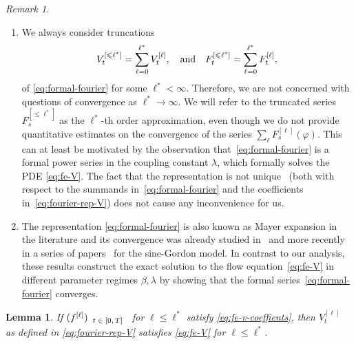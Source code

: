 \documentclass[11pt, a4paper]{scrartcl}
\numberwithin{equation}{section}
\theoremstyle{plain}
\newtheorem{lemma}[foo]{Lemma}
\theoremstyle{remark}
\newtheorem{remark}[foo]{Remark}
\newcommand{\tmscript}[1]{\text{\scriptsize{$#1$}}}
\newenvironment{enumeratealpha}{\begin{enumerate}[a{\textup{)}}] }{\end{enumerate}}
\begin{document}
\begin{remark}
\begin{enumeratealpha}
    \item We always consider truncations
    \[ V_t^{[\leqslant \ell^{\ast}]} = \sum_{\ell = 0}^{\ell^{\ast}}
       V_t^{[\ell]}, \quad \text{and\quad} F_t^{[\leqslant \ell^{\ast}]} =
       \sum_{\ell = 0}^{\ell^{\ast}} F_t^{[\ell]}, \]
    of \eqref{eq:formal-fourier} for some $\ell^{\ast} < \infty$. Therefore,
    we are not concerned with questions of convergence as $\ell^{\ast}
    \rightarrow \infty$. We will refer to the
    truncated series $F^{[\leqslant \ell^{\ast}]}_s$ as the
    {$\ell^{\ast}$-th order approximation}, even though we do not
    provide quantitative estimates on the convergence of the series
    $\sum_{\ell} F^{[\ell]}_s (\varphi)$. This can at least be motivated by
    the observation that~\eqref{eq:formal-fourier} is a formal power series in
    the coupling constant $\lambda$, which formally solves the PDE \eqref{eq:fe-V}. The fact that the representation is not
    unique \ (both with respect to the summands in~\eqref{eq:formal-fourier}
    and the coefficients in~\eqref{eq:fourier-rep-V}) does not cause any
    inconvenience for us.
    
    \item The representation \eqref{eq:formal-fourier} is also known as Mayer
    expansion in the literature and its convergence was already studied
    in~{\cite{brydgesMayerExpansionsHamiltonJacobi1987}} and more recently in
    a series of
    papers~{\cite{bauerschmidtLogSobolevInequalityContinuum2021,bauerschmidtMaximumCouplingSineGordon2022,bauerschmidtColemanCorrespondenceFree2023,kroschinskyMayerSeriesTwoDimensional2019}}
    for the sine-Gordon model. In contrast to our analysis, these results
    construct the exact solution to the flow equation~\eqref{eq:fe-V} in different parameter regimes $\beta,\lambda$ by showing that the formal
    series~\eqref{eq:formal-fourier} converges.
  \end{enumeratealpha}
\end{remark}
\begin{lemma}\label{lem:equivalence-fe}
  If $(f^{[\ell]})_{\tmscript{\begin{array}{c}
    t \in [0, T]
  \end{array}}}$ for $\ell \leqslant \ell^{\ast}$ satisfy
  \eqref{eq:fe-v-coeffients}, then $V^{[\ell]}_t$ as defined in
  \eqref{eq:fourier-rep-V} satisfies \eqref{eq:fe-V} for $\ell\leqslant\ell^\ast$.
\end{lemma}
\end{document}
